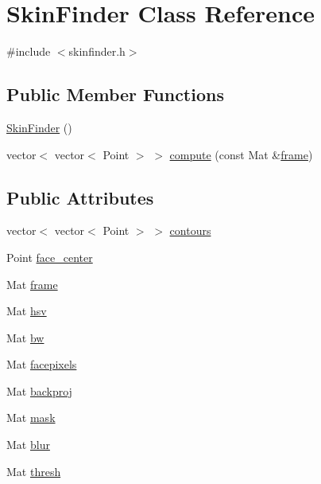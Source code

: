 \hypertarget{class_skin_finder}{
\section{SkinFinder Class Reference}
\label{class_skin_finder}
}


{\ttfamily \#include $<$skinfinder.h$>$}

\subsection*{Public Member Functions}
\begin{DoxyCompactItemize}
\item 
\hyperlink{class_skin_finder_aac7af0cb4507fc573997c4fb63ad21f0}{SkinFinder} ()
\item 
vector$<$ vector$<$ Point $>$ $>$ \hyperlink{class_skin_finder_a407aba46cd098b2cd45f458470a1aeab}{compute} (const Mat \&\hyperlink{class_skin_finder_ae7f9082d757d32f18c06b1f4ab600467}{frame})
\end{DoxyCompactItemize}
\subsection*{Public Attributes}
\begin{DoxyCompactItemize}
\item 
vector$<$ vector$<$ Point $>$ $>$ \hyperlink{class_skin_finder_a6921f1002639c7a369f637b229de376a}{contours}
\item 
Point \hyperlink{class_skin_finder_a55330ad48d6c72f9a0f9d16a874b39ce}{face\_\-center}
\item 
Mat \hyperlink{class_skin_finder_ae7f9082d757d32f18c06b1f4ab600467}{frame}
\item 
Mat \hyperlink{class_skin_finder_a5e36bd9b188370eb528beeed691d6d2f}{hsv}
\item 
Mat \hyperlink{class_skin_finder_a325d75cde01cb02243af4dee842f6512}{bw}
\item 
Mat \hyperlink{class_skin_finder_a93fd2ba0d7494ec4aa2443352fe4f961}{facepixels}
\item 
Mat \hyperlink{class_skin_finder_aed495dc76d3c5f96eb97805d49923e59}{backproj}
\item 
Mat \hyperlink{class_skin_finder_a40173df66e4ec87e0c69c4858e49f7a7}{mask}
\item 
Mat \hyperlink{class_skin_finder_abc551e869a5beddbc7d4c956653d414e}{blur}
\item 
Mat \hyperlink{class_skin_finder_a199a4f558e062704a4c24d65801e47ba}{thresh}
\end{DoxyCompactItemize}


